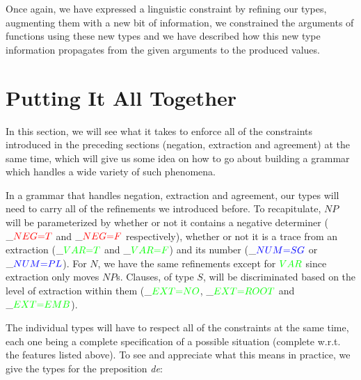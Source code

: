 Once again, we have expressed a linguistic constraint by refining our
types, augmenting them with a new bit of information, we constrained the
arguments of functions using these new types and we have described how
this new type information propagates from the given arguments to the
produced values.


\section{Putting It All Together}
\label{sec:together}

In this section, we will see what it takes to enforce all of the
constraints introduced in the preceding sections (negation, extraction
and agreement) at the same time, which will give us some idea on how to
go about building a grammar which handles a wide variety of such
phenomena.

In a grammar that handles negation, extraction and agreement, our types
will need to carry all of the refinements we introduced before. To
recapitulate, $NP$ will be parameterized by whether or not it contains a
negative determiner ($\_\textcolor{red}{NEG{=}T}$ and
$\_\textcolor{red}{NEG{=}F}$ respectively), whether or not it is a trace
from an extraction ($\_\textcolor{green}{VAR{=}T}$ and
$\_\textcolor{green}{VAR{=}F}$) and its number
($\_\textcolor{blue}{NUM{=}SG}$ or $\_\textcolor{blue}{NUM{=}PL}$). For
$N$, we have the same refinements except for $\textcolor{green}{VAR}$
since extraction only moves $NP$s. Clauses, of type $S$, will be
discriminated based on the level of extraction within them
($\_\textcolor{green}{EXT{=}NO}$, $\_\textcolor{green}{EXT{=}ROOT}$ and
$\_\textcolor{green}{EXT{=}EMB}$).

The individual types will have to respect all of the constraints at the
same time, each one being a complete specification of a possible
situation (complete w.r.t. the features listed above). To see and
appreciate what this means in practice, we give the types for the
preposition \emph{de}:

